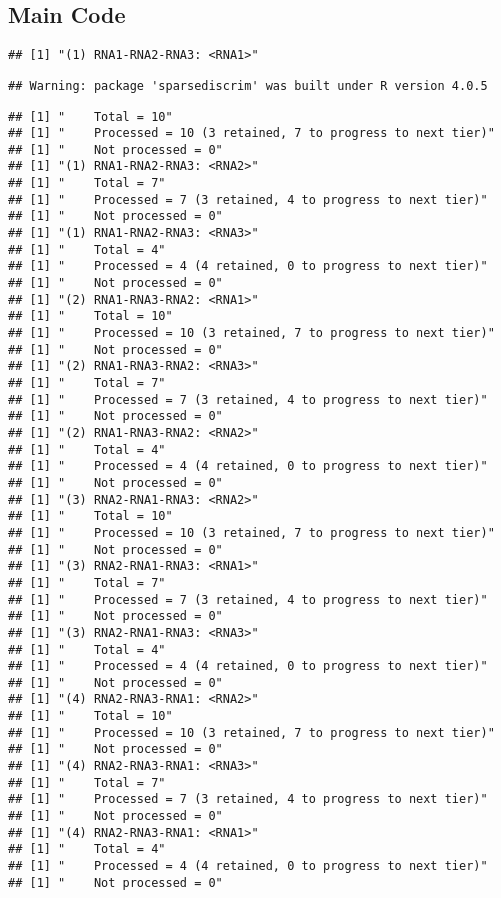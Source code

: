 \documentclass[
]{article}
\begin{document}
\hypertarget{main-code}{%
\subsection{Main Code}\label{main-code}}

\begin{verbatim}
## [1] "(1) RNA1-RNA2-RNA3: <RNA1>"
\end{verbatim}

\begin{verbatim}
## Warning: package 'sparsediscrim' was built under R version 4.0.5
\end{verbatim}

\begin{verbatim}
## [1] "    Total = 10"
## [1] "    Processed = 10 (3 retained, 7 to progress to next tier)"
## [1] "    Not processed = 0"
## [1] "(1) RNA1-RNA2-RNA3: <RNA2>"
## [1] "    Total = 7"
## [1] "    Processed = 7 (3 retained, 4 to progress to next tier)"
## [1] "    Not processed = 0"
## [1] "(1) RNA1-RNA2-RNA3: <RNA3>"
## [1] "    Total = 4"
## [1] "    Processed = 4 (4 retained, 0 to progress to next tier)"
## [1] "    Not processed = 0"
## [1] "(2) RNA1-RNA3-RNA2: <RNA1>"
## [1] "    Total = 10"
## [1] "    Processed = 10 (3 retained, 7 to progress to next tier)"
## [1] "    Not processed = 0"
## [1] "(2) RNA1-RNA3-RNA2: <RNA3>"
## [1] "    Total = 7"
## [1] "    Processed = 7 (3 retained, 4 to progress to next tier)"
## [1] "    Not processed = 0"
## [1] "(2) RNA1-RNA3-RNA2: <RNA2>"
## [1] "    Total = 4"
## [1] "    Processed = 4 (4 retained, 0 to progress to next tier)"
## [1] "    Not processed = 0"
## [1] "(3) RNA2-RNA1-RNA3: <RNA2>"
## [1] "    Total = 10"
## [1] "    Processed = 10 (3 retained, 7 to progress to next tier)"
## [1] "    Not processed = 0"
## [1] "(3) RNA2-RNA1-RNA3: <RNA1>"
## [1] "    Total = 7"
## [1] "    Processed = 7 (3 retained, 4 to progress to next tier)"
## [1] "    Not processed = 0"
## [1] "(3) RNA2-RNA1-RNA3: <RNA3>"
## [1] "    Total = 4"
## [1] "    Processed = 4 (4 retained, 0 to progress to next tier)"
## [1] "    Not processed = 0"
## [1] "(4) RNA2-RNA3-RNA1: <RNA2>"
## [1] "    Total = 10"
## [1] "    Processed = 10 (3 retained, 7 to progress to next tier)"
## [1] "    Not processed = 0"
## [1] "(4) RNA2-RNA3-RNA1: <RNA3>"
## [1] "    Total = 7"
## [1] "    Processed = 7 (3 retained, 4 to progress to next tier)"
## [1] "    Not processed = 0"
## [1] "(4) RNA2-RNA3-RNA1: <RNA1>"
## [1] "    Total = 4"
## [1] "    Processed = 4 (4 retained, 0 to progress to next tier)"
## [1] "    Not processed = 0"

\end{verbatim}
\end{document}
